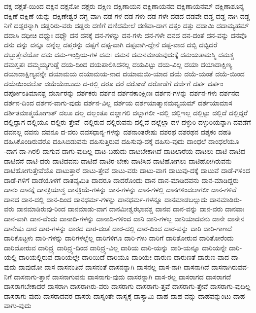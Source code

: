 {ದಕ್ಷ
ದಕ್ಷತೆ-ಯಿಂದ
ದಕ್ಷನ
ದಕ್ಷನೋ
ದಕ್ಷರು
ದಕ್ಷಿಣ
ದಕ್ಷಿಣಾಯನ
ದಕ್ಷಿಣಾಯನದ
ದಕ್ಷಿಣಾಯನಮ್
ದಕ್ಷಿಣಾಶೂನ್ಯ
ದಕ್ಷಿಣೆ
ದಕ್ಷಿಣೆ-ಯನ್ನು
ದಕ್ಷಿಣೇಶ್ವರ
ದಗ್ಧ-ವಾಗಿ
ದಡ-ಗಳ
ದಡ-ಗಳು
ದಡ-ಗಳೇ
ದಡದ
ದಡವೇ
ದಡ್ಡ
ದಡ್ಡ-ನಾಗಿ
ದಡ್ಡ-ನಿಗೆ
ದಡ್ಡರನ್ನಾಗಿ
ದಡ್ಡರಿರು-ವರು
ದಡ್ಡರು
ದಣಿಗೆ
ದಣಿದಮೇಲೆ
ದಣಿವಾ-ದಾಗ
ದತ್ತಂ
ದತ್ತು
ದದಾಮಿ
ದದಾಮ್ಯಹಮ್
ದದಾಸಿ
ದಧೀಚಿ
ದಧ್ಮುಃ
ದಧ್ಮೌ
ದನ
ದನಕ್ಕೆ
ದನ-ಗಳನ್ನು
ದನ-ಗಳು
ದನ-ಗಳೇ
ದನದ
ದನ-ದಂತೆ
ದನ-ವನ್ನು
ದನವೊ
ದನು
ದನ್ನು
ದನ್ನೂ
ದನ್ನೆಲ್ಲ
ದಪ್ತರನ್ನು
ದಪ್ಪಗೆ
ದಪ್ಪ-ವಾಗಿ
ದಪ್ಪವಾಗಿ-ದ್ದೇನೆ
ದಪ್ಪ-ವಾದ
ದಬ್ಬಿ
ದಬ್ಬಿದರೆ
ದಬ್ಬುತ್ತೇವೆಯೋ
ದಮ
ದಮ-ಇಂದ್ರಿಯ-ಗಳ
ದಮಃ
ದಮನ
ದಮನಮಾಡುವುದುಕ್ಕೆ
ದಮಯತಾಮಸ್ಮಿ
ದಮಶ್ಚ
ದಮಸ್ತಪಃ
ದಮ್ಮಯ್ಯಗುಡ್ಡೆ
ದಯ-ದಿಂದ
ದಯಪಾಲಿಸಿದನಲ್ಲ
ದಯವಿಟ್ಟು
ದಯ-ವಿಲ್ಲ
ದಯಾ
ದಯಾದಾಕ್ಷಿಣ್ಯ
ದಯಾದಾಕ್ಷಿಣ್ಯವನ್ನೇ
ದಯಾಮಯ
ದಯಾಮಯ-ನಾದ
ದಯಾಮಯಿ-ಯಾದ
ದಯೆ
ದಯೆ-ಯಂತೆ
ದಯೆ-ಯಿಂದ
ದಯೆಯಿಂದಲೋ
ದಯೆಯೆಂಬುದು
ದ-ರಲ್ಲಿ
ದರೂ
ದರೆ
ದರೋಡೆ
ದರೋಡೆಗೆ
ದರ್ಜೆಗೆ
ದರ್ಪ
ದರ್ಪಂ
ದರ್ಪೋಽತಿಮಾನಶ್ಚ
ದರ್ಬಾರನ್ನು
ದರ್ಶಕರು
ದರ್ಶನ
ದರ್ಶನಕಾಂಕ್ಷಿಣಃ
ದರ್ಶನ-ಗಳನ್ನು
ದರ್ಶನ-ಗಳು
ದರ್ಶನದ
ದರ್ಶನ-ದಿಂದ
ದರ್ಶನ-ವಾಗು-ವುದು
ದರ್ಶನ-ವಿಲ್ಲ
ದರ್ಶಯ
ದರ್ಶಯಾತ್ಮಾನಮವ್ಯಯಮ್
ದರ್ಶಯಾಮಾಸ
ದರ್ಶಿತಮಾತ್ಮಯೋಗಾತ್
ದಲೂ
ದಲ್ಲ
ದಲ್ಲಂತೂ
ದಲ್ಲಾಗಲಿ
ದಲ್ಲಾಗಲೀ
-ದಲ್ಲಿ
ದಲ್ಲಿಇಲ್ಲ
ದಲ್ಲಿಟ್ಟು
ದಲ್ಲಿದೆ
ದಲ್ಲಿದ್ದರೆ
ದಲ್ಲಿದ್ದಾಗ
ದಲ್ಲಿಯೂ
ದಲ್ಲಿರು-ತ್ತೇವೆ
-ದಲ್ಲಿರುವ
ದಲ್ಲಿರುವನು
ದಲ್ಲಿವೆ
ದಲ್ಲೆಲ್ಲಾ
ದಳ
ದಳ್ಳುರಿ
ದಳ್ಳುರಿಯನ್ನಾಗಿ
ದವಡೆಗೆ
ದವನಲ್ಲ
ದವನು
ದವನೂ
ದ-ವರು
ದವಸಧಾನ್ಯ-ಗಳನ್ನು
ದಶನಾಂತರೇಷು
ದಶರಥ
ದಶರಥನ
ದಶೈಕಂ
ದಹತಿ
ದಹಿಸಿಕೊಂಡಿರುವರೊ
ದಹಿಸಿಬಿಡುವನು
ದಹಿಸುತ್ತಿರುವ
ದಹಿಸುವು-ದಕ್ಕೆ
ದಹಿಸು-ವುದು
ದಾಂಧಲೆ
ದಾಂಧಲೆಯೂ
-ದಾಗ
ದಾ-ಗಿರಲಿ
ದಾಗುವ
ದಾಗು-ವುದಿಲ್ಲ
ದಾಟ-ಬಹುದು
ದಾಟಬೇಕಾಗಿದೆ
ದಾಟಲಾರೆಯ
ದಾಟಲು
ದಾಟಿ
ದಾಟಿದ
ದಾಟಿದನೆ
ದಾಟಿ-ದರು
ದಾಟಿದವನು
ದಾಟಿದೆ
ದಾಟಿರ-ಬೇಕು
ದಾಟಿಸಿದ
ದಾಟಿಹೋಗಲು
ದಾಟಿಹೋಗಿರುವನು
ದಾಟಿಹೋಗುತ್ತೇವೆಯೊ
ದಾಟುತ್ತಾರೆ
ದಾಟು-ತ್ತೇವೆ
ದಾಟು-ವರು
ದಾಟು-ವಾಗ
ದಾಟುವು-ದಕ್ಕೆ
ದಾಟುವೆ
ದಾಡೆ-ಗಳಿಂದ
ದಾಡೆ-ಗಳಿಗೆ
ದಾಡೆಯೊಳಗೆ
ದಾತವ್ಯಮಿತಿ
ದಾದರೂ
ದಾದರೊಂದು
ದಾನ
ದಾನ-ಮಾಡಿದವನು
ದಾನ-ಮಾಡಿದ್ದರು
ದಾನಂ
ದಾನಕ್ಕೆ
ದಾನಕ್ರಿಯಾಶ್ಚ
ದಾನಕ್ರಿಯೆ-ಗಳನ್ನು
ದಾನ-ಗಳನ್ನು
ದಾನ-ಗಳಲ್ಲಿ
ದಾನಗಳಿಂದಲಾಗಲೀ
ದಾನ-ಗಳಿವೆ
ದಾನದ
ದಾನ-ದಲ್ಲಿ
ದಾನ-ದಿಂದ
ದಾನಧರ್ಮ-ಗಳನ್ನು
ದಾನಧರ್ಮ-ಗಳನ್ನೂ
ದಾನಮಾಡಬಲ್ಲುದು
ದಾನಮಾಡಿರು-ವರು
ದಾನಮಾಡಿರುವು-ರಿಂದ
ದಾನಮಾಡು-ವಾಗ
ದಾನಮೀಶ್ವರಭಾವಶ್ಚ
ದಾನವ
ದಾನ-ವನ್ನು
ದಾನ-ವರು
ದಾನವಾಃ
ದಾನ-ವಾಗಿ
ದಾನ-ವೆಂದು
ದಾನಾದಿ-ಗಳನ್ನು
ದಾನಾದಿ-ಗಳಿಂದ
ದಾನಿ
ದಾನಿ-ಗಳಲ್ಲ
ದಾನಿಯಾದವನು
ದಾನೇ
ದಾನೇನ
ದಾನೇಷು
ದಾರ
ದಾರ-ಗಳನ್ನು
ದಾರದ
ದಾರ-ದಂತೆ
ದಾರ-ದಲ್ಲಿ
ದಾರ-ದಿಂದ
ದಾರ-ವನ್ನು
ದಾರಿ
ದಾರಿ-ಗಾಣದೆ
ದಾರಿಕೊಟ್ಟಳು
ದಾರಿ-ಗಳನ್ನು
ದಾರಿಗಳಲ್ಲೆಲ್ಲ
ದಾರಿಗಳಿಗೂ
ದಾರಿ-ಗಳು
ದಾರಿಗೆ
ದಾರಿತೋರುವ
ದಾರಿತೋರೆಂದು
ದಾರಿದೋರುವ
ದಾರಿದ್ರ್ಯ
ದಾರಿದ್ರ್ಯ-ದಿಂದ
ದಾರಿದ್ರ್ಯ-ವಿಲ್ಲ
ದಾರಿಯ
ದಾರಿ-ಯನ್ನು
ದಾರಿ-ಯನ್ನೂ
ದಾರಿಯನ್ನೇ
ದಾರಿ-ಯಲ್ಲಿ
ದಾರಿಯಲ್ಲಿರುವ
ದಾರಿಯಲ್ಲೇ
ದಾರಿಯಿದೆ
ದಾರಿಯೂ
ದಾರಿಯೇ
ದಾರುಣ
ದಾರುಣತೆ
ದಾರುಣ-ವಾದ
ದಾ-ವುದು
ದಾವುದೋ
ದಾಸ
ದಾಸನಂತಿದೆ
ದಾಸನಂತೆ
ದಾಸನನ್ನಾಗಿ
ದಾಸನಲ್ಲ
ದಾಸ-ನಾಗಿ
ದಾಸನಾಗಿದೆ
ದಾಸನಾಗಿರುವವ-ನಿಗೆ
ದಾಸನಾಗು-ತ್ತಾನೆ
ದಾಸನಾಗುವನು
ದಾಸನಾಗು-ವುದು
ದಾಸರನ್ನಾಗಿ
ದಾಸ-ರಲ್ಲ
ದಾಸರಾಗದ
ದಾಸರಾಗದೆ
ದಾಸರಾಗಬೇಕಾದರೆ
ದಾಸರಾಗಿ
ದಾಸರಾಗಿರು-ವರು
ದಾಸರಾಗು
ದಾಸರಾಗು-ತ್ತವೆ
ದಾಸರಾಗು-ತ್ತೇವೆ
ದಾಸರಾಗು-ವುದಿಲ್ಲ
ದಾಸರಾಗು-ವುದು
ದಾಸರಾದವರ
ದಾಸರು
ದಾಸ್ಯಂತೇ
ದಾಸ್ಯಕ್ಕೆ
ದಾಸ್ಯಾಮಿ
ದಾಹ
ದಾಹ-ವನ್ನು
ದಾಹವನ್ನುಂಟು
ದಾಹ-ವಾಗು-ವುದು
}
